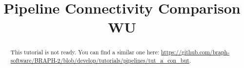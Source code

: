 \documentclass[justified]{tufte-handout}
\title{Pipeline Connectivity Comparison WU}
\begin{document}
\maketitle

\begin{abstract}
\noindent
This tutorial is not ready. You can find a similar one here: \url{https://github.com/braph-software/BRAPH-2/blob/develop/tutorials/pipelines/tut_a_con_but}.
\end{abstract}
\end{document}
